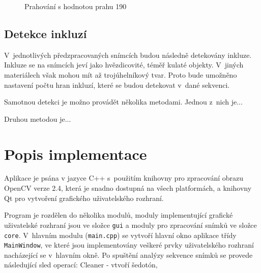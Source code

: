 \documentclass[12pt, a4paper]{report}
\begin{document}
	\begin{figure}[!htb]
	\centering
	\label{fig:prahovani_190}
	\caption{Prahování s hodnotou prahu 190}
	\end{figure}
	
	\section{Detekce inkluzí}
V~jednotlivých předzpracovaných snímcích budou následně detekovány inkluze. Inkluze se na snímcích jeví jako hvězdicovité, téměř kulaté objekty. V~jiných materiálech však mohou mít až trojúhelníkový tvar. Proto bude umožněno nastavení počtu hran inkluzí, které se budou detekovat v~dané sekvenci.

Samotnou detekci je možno provádět několika metodami. Jednou z~nich je...

Druhou metodou je...

\chapter{Popis implementace}
Aplikace je psána v jazyce C++ s~použitím knihovny pro zpracování obrazu OpenCV verze 2.4, která je snadno dostupná na všech platformách, a knihovny Qt pro vytvoření grafického uživatelského rozhraní.
	
	Program je rozdělen do několika modulů, moduly implementující grafické uživatelské rozhraní jsou ve složce \texttt{gui} a moduly pro zpracování snímků ve složce \texttt{core}. V~hlavním modulu (\texttt{main.cpp}) se vytvoří hlavní okno aplikace třídy \texttt{MainWindow}, ve které jsou implementovány veškeré prvky uživatelského rozhraní nacházející se v~hlavním okně. Po spuštění analýzy sekvence snímků se provede následující sled operací: Cleaner - vtvoří šedotón, 
\end{document}
